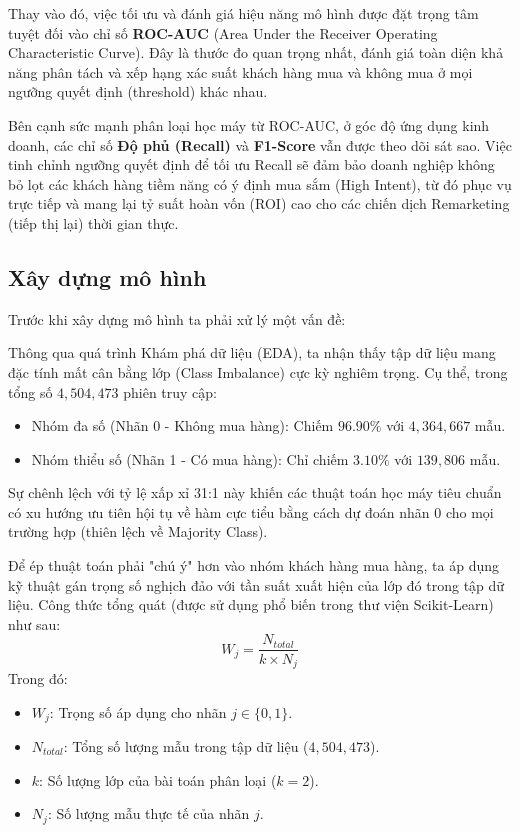 \documentclass[a4paper,11pt]{article}
\begin{document}
Thay vào đó, việc tối ưu và đánh giá hiệu năng mô hình được đặt trọng tâm tuyệt đối vào chỉ số \textbf{ROC-AUC} (Area Under the Receiver Operating Characteristic Curve). Đây là thước đo quan trọng nhất, đánh giá toàn diện khả năng phân tách và xếp hạng xác suất khách hàng mua và không mua ở mọi ngưỡng quyết định (threshold) khác nhau. 

Bên cạnh sức mạnh phân loại học máy từ ROC-AUC, ở góc độ ứng dụng kinh doanh, các chỉ số \textbf{Độ phủ (Recall)} và \textbf{F1-Score} vẫn được theo dõi sát sao. Việc tinh chỉnh ngưỡng quyết định để tối ưu Recall sẽ đảm bảo doanh nghiệp không bỏ lọt các khách hàng tiềm năng có ý định mua sắm (High Intent), từ đó phục vụ trực tiếp và mang lại tỷ suất hoàn vốn (ROI) cao cho các chiến dịch Remarketing (tiếp thị lại) thời gian thực.
\subsection{Xây dựng mô hình}
Trước khi xây dựng mô hình ta phải xử lý một vấn đề:

Thông qua quá trình Khám phá dữ liệu (EDA), ta nhận thấy tập dữ liệu mang đặc tính mất cân bằng lớp (Class Imbalance) cực kỳ nghiêm trọng. Cụ thể, trong tổng số $4,504,473$ phiên truy cập:
\begin{itemize}
    \item Nhóm đa số (Nhãn 0 - Không mua hàng): Chiếm $96.90\%$ với $4,364,667$ mẫu.
    \item Nhóm thiểu số (Nhãn 1 - Có mua hàng): Chỉ chiếm $3.10\%$ với $139,806$ mẫu.
\end{itemize}
Sự chênh lệch với tỷ lệ xấp xỉ 31:1 này khiến các thuật toán học máy tiêu chuẩn có xu hướng ưu tiên hội tụ về hàm cực tiểu bằng cách dự đoán nhãn 0 cho mọi trường hợp (thiên lệch về Majority Class). 

Để ép thuật toán phải "chú ý" hơn vào nhóm khách hàng mua hàng, ta áp dụng kỹ thuật gán trọng số nghịch đảo với tần suất xuất hiện của lớp đó trong tập dữ liệu. Công thức tổng quát (được sử dụng phổ biến trong thư viện Scikit-Learn) như sau:
$$ W_j = \frac{N_{total}}{k \times N_j} $$
Trong đó:
\begin{itemize}
    \item $W_j$: Trọng số áp dụng cho nhãn $j \in \{0, 1\}$.
    \item $N_{total}$: Tổng số lượng mẫu trong tập dữ liệu ($4,504,473$).
    \item $k$: Số lượng lớp của bài toán phân loại ($k = 2$).
    \item $N_j$: Số lượng mẫu thực tế của nhãn $j$.
\end{itemize}
\end{document}
